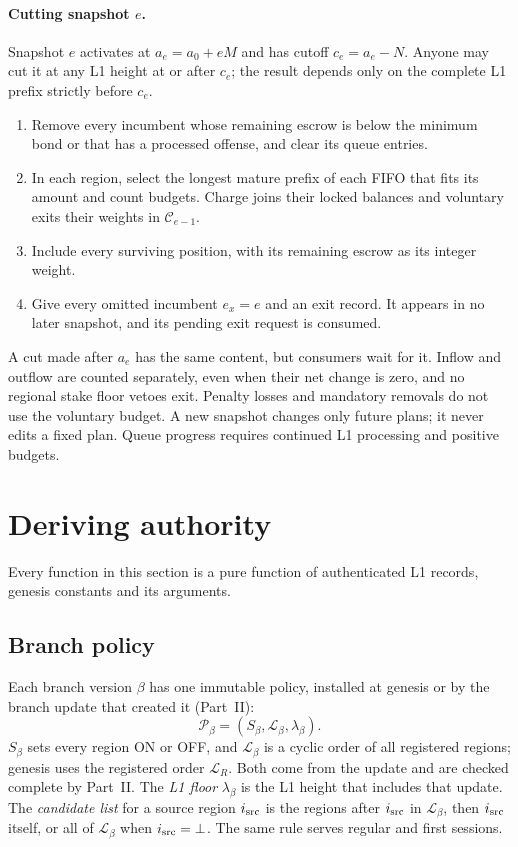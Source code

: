 \documentclass[11pt,a4paper]{article}
\newcommand{\cfg}{\mathcal C}
\begin{document}
\paragraph{Cutting snapshot $e$.}
Snapshot $e$ activates at $a_e=a_0+eM$ and has cutoff $c_e=a_e-N$.
Anyone may cut it at any L1 height at or after $c_e$; the result depends
only on the complete L1 prefix strictly before $c_e$.
\begin{enumerate}[label=\textbf{\arabic*.},itemsep=2pt]
\item Remove every incumbent whose remaining escrow is below the minimum
bond or that has a processed offense, and clear its queue entries.
\item In each region, select the longest mature prefix of each FIFO that
fits its amount and count budgets. Charge joins their locked balances
and voluntary exits their weights in $\cfg_{e-1}$.
\item Include every surviving position, with its remaining escrow as its
integer weight.
\item Give every omitted incumbent $e_x=e$ and an exit record. It appears
in no later snapshot, and its pending exit request is consumed.
\end{enumerate}
A cut made after $a_e$ has the same content, but consumers wait for it.
Inflow and outflow are counted separately, even when their net change is
zero, and no regional stake floor vetoes exit. Penalty losses and
mandatory removals do not use the voluntary budget. A new snapshot
changes only future plans; it never edits a fixed plan. Queue progress
requires continued L1 processing and positive budgets.

\section{Deriving authority}
\label{sec:derive}
Every function in this section is a pure function of authenticated L1
records, genesis constants and its arguments.

\subsection{Branch policy}
\label{sec:policy}
Each branch version $\beta$ has one immutable policy, installed at
genesis or by the branch update that created it (Part~II):
\[
 \mathcal P_\beta=(S_\beta,\mathcal L_\beta,\lambda_\beta).
\]
$S_\beta$ sets every region ON or OFF, and $\mathcal L_\beta$ is a cyclic
order of all registered regions; genesis uses the registered order
$\mathcal L_R$. Both come from the update and are checked complete by
Part~II. The \emph{L1 floor} $\lambda_\beta$ is the L1 height that
includes that update. The \emph{candidate list} for a source region
$i_{\rm src}$ is the regions after $i_{\rm src}$ in $\mathcal L_\beta$,
then $i_{\rm src}$ itself, or all of $\mathcal L_\beta$ when
$i_{\rm src}=\bot$. The same rule serves regular and first sessions.
\end{document}
